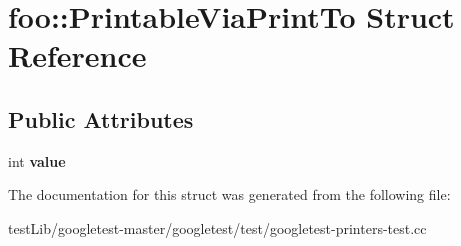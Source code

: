 \hypertarget{structfoo_1_1PrintableViaPrintTo}{}\section{foo\+:\+:Printable\+Via\+Print\+To Struct Reference}
\label{structfoo_1_1PrintableViaPrintTo}
\subsection*{Public Attributes}
\begin{DoxyCompactItemize}
\item 
\mbox{\label{structfoo_1_1PrintableViaPrintTo_a16f8c6420275d86f0d0112ca5a41bca2}} 
int {\bfseries value}
\end{DoxyCompactItemize}


The documentation for this struct was generated from the following file\+:\begin{DoxyCompactItemize}
\item 
test\+Lib/googletest-\/master/googletest/test/googletest-\/printers-\/test.\+cc\end{DoxyCompactItemize}
